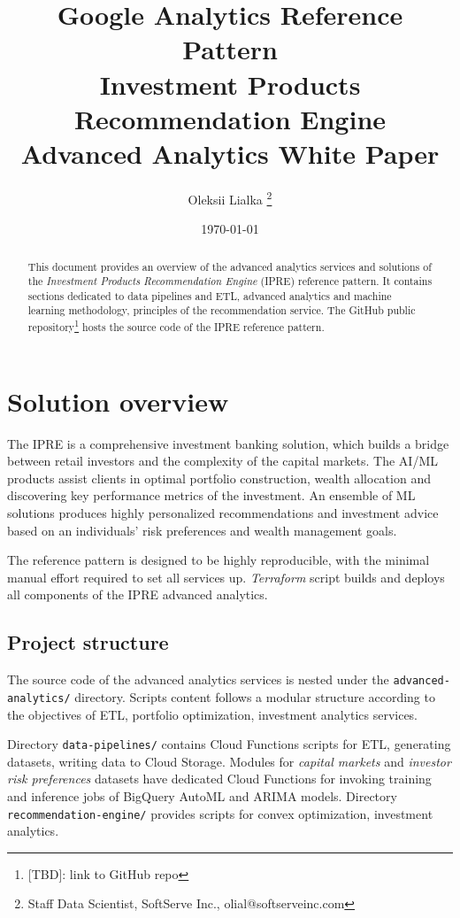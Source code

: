 \documentclass[twocolumn]{article}
\title{
    Google Analytics Reference Pattern \\
    Investment Products Recommendation Engine \\
    Advanced Analytics White Paper
}
\date{\today}
\author{
    Oleksii Lialka
    \thanks{Staff Data Scientist, SoftServe Inc., olial@softserveinc.com}
}
\begin{document}
\maketitle

\begin{abstract}
    This document provides an overview of the advanced analytics services and solutions of the \emph{Investment Products Recommendation Engine} (IPRE) reference pattern.
    It contains sections dedicated to data pipelines and ETL, advanced analytics and machine learning methodology, principles of the recommendation service.
    The GitHub public repository\footnote{[TBD]: link to GitHub repo} hosts the source code of the IPRE reference pattern.
\end{abstract}

\section{Solution overview}
    The IPRE is a comprehensive investment banking solution, which builds a bridge between retail investors and the complexity of the capital markets.
    The AI/ML products assist clients in optimal portfolio construction, wealth allocation and discovering key performance metrics of the investment.
    An ensemble of ML solutions produces highly personalized recommendations and investment advice based on an individuals' risk preferences and wealth management goals.

    The reference pattern is designed to be highly reproducible, with the minimal manual effort required to set all services up.
    \emph{Terraform} script builds and deploys all components of the IPRE advanced analytics.

\subsection{Project structure}
    The source code of the advanced analytics services is nested under the \verb|advanced-analytics/| directory.
    Scripts content follows a modular structure according to the objectives of ETL, portfolio optimization, investment analytics services.

    Directory \verb|data-pipelines/| contains Cloud Functions scripts for ETL, generating datasets, writing data to Cloud Storage.
    Modules for \emph{capital markets} and \emph{investor risk preferences} datasets have dedicated Cloud Functions for invoking training and inference jobs of BigQuery AutoML and ARIMA models.
    Directory \verb|recommendation-engine/| provides scripts for convex optimization, investment analytics.
\end{document}
